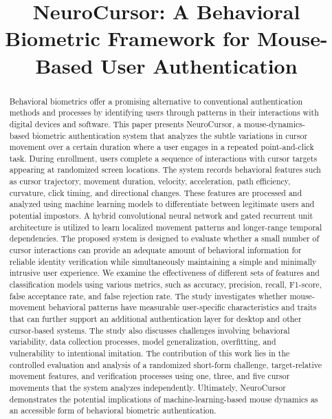 \documentclass[conference]{IEEEtran}
\title{NeuroCursor: A Behavioral Biometric Framework for Mouse-Based User Authentication}
\author{
\IEEEauthorblockN{
Shaurya Saxena,
Chetan Gangireddy,
Shreehan Aalok Pathak,
and Hamid Abdul Mossa
}
\IEEEauthorblockA{
July 2026\\
Computer Science Department\\
The University of Texas at Dallas\\
Richardson, Texas, United States
}
}
\begin{document}
\maketitle

\begin{abstract}
    Behavioral biometrics offer a promising alternative to conventional authentication methods and processes by identifying users through patterns in their interactions with digital devices and software. This paper presents NeuroCursor, a mouse-dynamics-based biometric authentication system that analyzes the subtle variations in cursor movement over a certain duration where a user engages in a repeated point-and-click task. During enrollment, users complete a sequence of interactions with cursor targets appearing at randomized screen locations. The system records behavioral features such as cursor trajectory, movement duration, velocity, acceleration, path efficiency, curvature, click timing, and directional changes. These features are processed and analyzed using machine learning models to differentiate between legitimate users and potential impostors. A hybrid convolutional neural network and gated recurrent unit architecture is utilized to learn localized movement patterns and longer-range temporal dependencies. The proposed system is designed to evaluate whether a small number of cursor interactions can provide an adequate amount of behavioral information for reliable identity verification while simultaneously maintaining a simple and minimally intrusive user experience. We examine the effectiveness of different sets of features and classification models using various metrics, such as accuracy, precision, recall, F1-score, false acceptance rate, and false rejection rate. The study investigates whether mouse-movement behavioral patterns have measurable user-specific characteristics and traits that can further support an additional authentication layer for desktop and other cursor-based systems. The study also discusses challenges involving behavioral variability, data collection processes, model generalization, overfitting, and vulnerability to intentional imitation. The contribution of this work lies in the controlled evaluation and analysis of a randomized short-form challenge, target-relative movement features, and verification processes using one, three, and five cursor movements that the system analyzes independently. Ultimately, NeuroCursor demonstrates the potential implications of machine-learning-based mouse dynamics as an accessible form of behavioral biometric authentication. 
\end{abstract}
\end{document}
